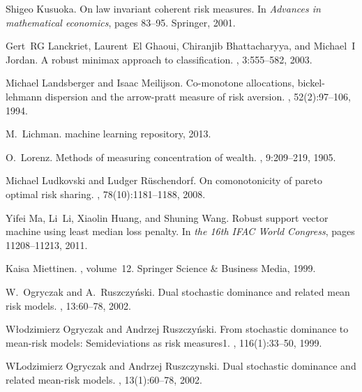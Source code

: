 \documentclass[10pt,letterpaper]{article}
\newcommand{\1}{1{\hskip -2.55 pt}\hbox{I}}
\begin{document}
\begin{thebibliography}{10}
Shigeo Kusuoka.
\newblock On law invariant coherent risk measures.
\newblock In {\em Advances in mathematical economics}, pages 83--95. Springer,
  2001.

Gert~RG Lanckriet, Laurent~El Ghaoui, Chiranjib Bhattacharyya, and Michael~I
  Jordan.
\newblock A robust minimax approach to classification.
, 3:555--582, 2003.

Michael Landsberger and Isaac Meilijson.
\newblock Co-monotone allocations, bickel-lehmann dispersion and the
  arrow-pratt measure of risk aversion.
, 52(2):97--106, 1994.

M.~Lichman.
 machine learning repository, 2013.

O.~Lorenz.
\newblock Methods of measuring concentration of wealth.
, 9:209--219,
  1905.

Michael Ludkovski and Ludger R{\"u}schendorf.
\newblock On comonotonicity of pareto optimal risk sharing.
, 78(10):1181--1188, 2008.

Yifei Ma, Li~Li, Xiaolin Huang, and Shuning Wang.
\newblock Robust support vector machine using least median loss penalty.
\newblock In {\em the 16th IFAC World Congress}, pages 11208--11213, 2011.

Kaisa Miettinen.
, volume~12.
\newblock Springer Science \& Business Media, 1999.

W.~Ogryczak and A.~Ruszczy\'nski.
\newblock Dual stochastic dominance and related mean risk models.
, 13:60--78, 2002.

W{\l}odzimierz Ogryczak and Andrzej Ruszczy{\'n}ski.
\newblock From stochastic dominance to mean-risk models: Semideviations as risk
  measures1.
, 116(1):33--50, 1999.

WLodzimierz Ogryczak and Andrzej Ruszczynski.
\newblock Dual stochastic dominance and related mean-risk models.
, 13(1):60--78, 2002.


\end{thebibliography}
\end{document}
